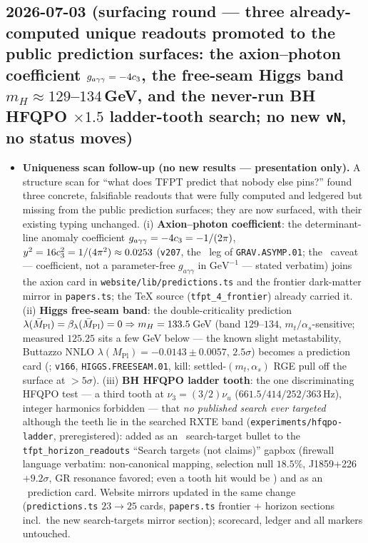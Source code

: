 \subsection*{2026-07-03 (surfacing round --- three already-computed unique readouts promoted to the public prediction surfaces: the axion--photon coefficient $g_{a\gamma\gamma}=-4c_3$, the free-seam Higgs band $m_H\approx129$--$134$\,GeV, and the never-run BH HFQPO $\times1.5$ ladder-tooth search; no new \texttt{vN}, no status moves)}
\begin{itemize}[leftmargin=1.5em]
\item \textbf{Uniqueness scan follow-up (no new results --- presentation only).} A structure scan for
``what does TFPT predict that nobody else pins?'' found three concrete, falsifiable readouts that were
fully computed and ledgered but missing from the public prediction surfaces; they are now surfaced,
with their existing typing unchanged. (i) \textbf{Axion--photon coefficient}: the determinant-line
anomaly coefficient $g_{a\gamma\gamma}=-4c_3=-1/(2\pi)$, $y^2=16c_3^2=1/(4\pi^2)\approx0.0253$
(\texttt{v207}, the \mE\ leg of \texttt{GRAV.ASYMP.01}; the \mC\ caveat --- coefficient, not a
parameter-free $g_{a\gamma\gamma}$ in $\mathrm{GeV}^{-1}$ --- stated verbatim) joins the axion card in
\texttt{website/lib/predictions.ts} and the frontier dark-matter mirror in \texttt{papers.ts}; the TeX
source (\texttt{tfpt\_4\_frontier}) already carried it. (ii) \textbf{Higgs free-seam band}: the
double-criticality prediction $\lambda(\bar M_{\mathrm{Pl}})=\beta_\lambda(\bar M_{\mathrm{Pl}})=0\Rightarrow m_H=133.5$\,GeV (band
$129$--$134$, $m_t/\alpha_s$-sensitive; measured $125.25$ sits a few GeV below --- the known slight
metastability, Buttazzo NNLO $\lambda(M_{\mathrm{Pl}})=-0.0143\pm0.0057$, $2.5\sigma$) becomes a
prediction card (\mC; \texttt{v166}, \texttt{HIGGS.FREESEAM.01}, kill: settled-$(m_t,\alpha_s)$ RGE pull
off the surface at $>5\sigma$). (iii) \textbf{BH HFQPO ladder tooth}: the one discriminating HFQPO test
--- a third tooth at $\nu_3=(3/2)\nu_u$ ($661.5/414/252/363$\,Hz), integer harmonics forbidden --- that
\emph{no published search ever targeted} although the teeth lie in the searched RXTE band
(\texttt{experiments/hfqpo-ladder}, preregistered): added as an \mO\ search-target bullet to the
\texttt{tfpt\_horizon\_readouts} ``Search targets (not claims)'' gapbox (firewall language verbatim:
non-canonical mapping, selection null $18.5\%$, J1859+226 $+9.2\sigma$, GR resonance favored; even a
tooth hit would be \mC) and as an \mO\ prediction card. Website mirrors updated in the same change
(\texttt{predictions.ts} $23\to25$ cards, \texttt{papers.ts} frontier + horizon sections incl.\ the new
search-targets mirror section); scorecard, ledger and all markers untouched.
\end{itemize}

